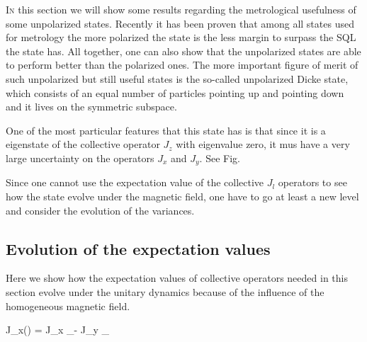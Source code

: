\lettrine[lines=2, findent=3pt,nindent=0pt]{I}{n} this section we will show some results regarding the metrological usefulness of some unpolarized states.
Recently it has been proven that among all states used for metrology the more polarized the state is the less margin to surpass the SQL the state has.
All together, one can also show that the unpolarized states are able to perform better than the polarized ones.
The more important figure of merit of such unpolarized but still useful states is the so-called unpolarized Dicke state, which consists of an equal number of particles pointing up and pointing down and it lives on the symmetric subspace.

One of the most particular features that this state has is that since it is a eigenstate of the collective operator $J_z$ with eigenvalue zero, it mus have a very large uncertainty on the operators $J_x$ and $J_y$. See Fig.

Since one cannot use the expectation value of the collective $J_l$ operators to see how the state evolve under the magnetic field, one have to go at least a new level and consider the evolution of the variances.

\subsection{Evolution of the expectation values}
Here we show how the expectation values of collective operators needed in this section evolve under the unitary dynamics because of the influence of the homogeneous magnetic field.

\be
  \tr J_x(\Theta) = J_x _\Theta - J_y _{\Theta}
\ee
